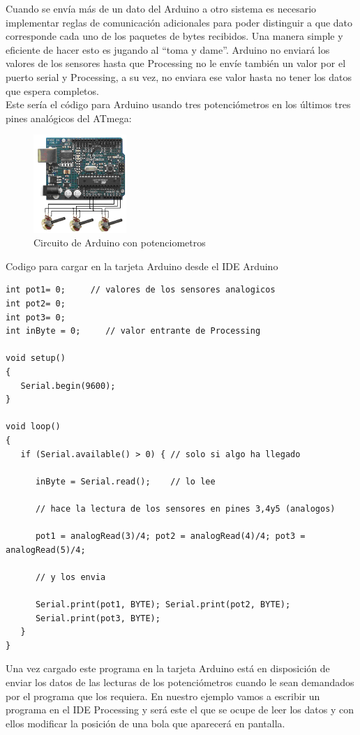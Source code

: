 Cuando se envía más de un dato del Arduino a otro sistema es necesario implementar reglas de comunicación adicionales para poder distinguir a que dato corresponde cada uno de los paquetes de bytes recibidos. Una manera simple y eficiente de hacer esto es jugando al “toma y dame”. Arduino no enviará los valores de los sensores hasta que Processing no le envíe también un valor por el puerto serial y Processing, a su vez, no enviara ese valor hasta no tener los datos que espera completos.\\
Este sería el código para Arduino usando tres potenciómetros en los últimos tres pines analógicos del ATmega:
\begin{figure}[!htp]
	\centering
	\includegraphics[width=100pt]{./Imagenes/Documentos/ArduinoNotebook_img15.png}
	\caption[Circuito Arduino con potenciometros]{Circuito de Arduino con potenciometros}
\end{figure}
Codigo para cargar en la tarjeta Arduino desde el IDE Arduino
\begin{lstlisting}
int pot1= 0;     // valores de los sensores analogicos
int pot2= 0;
int pot3= 0;
int inByte = 0;     // valor entrante de Processing

void setup()
{
   Serial.begin(9600);
}

void loop()
{
   if (Serial.available() > 0) { // solo si algo ha llegado

      inByte = Serial.read();    // lo lee

      // hace la lectura de los sensores en pines 3,4y5 (analogos)

      pot1 = analogRead(3)/4; pot2 = analogRead(4)/4; pot3 = analogRead(5)/4;

      // y los envia

      Serial.print(pot1, BYTE); Serial.print(pot2, BYTE); 
      Serial.print(pot3, BYTE);
   }
}
\end{lstlisting}
Una vez cargado este programa en la tarjeta Arduino está en disposición de enviar los datos de las lecturas de los potenciómetros cuando le sean demandados por el programa que los requiera. En nuestro ejemplo vamos a escribir un programa en el IDE Processing y será este el que se ocupe de leer los datos y con ellos modificar la posición de una bola que aparecerá en pantalla.\\
